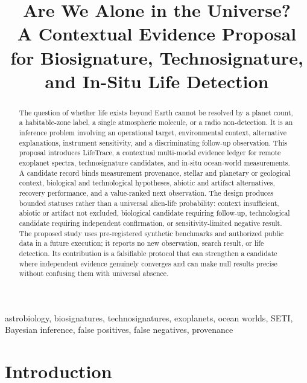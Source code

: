 \documentclass[conference]{IEEEtran}
\begin{document}
\title{Are We Alone in the Universe?\\
A Contextual Evidence Proposal for Biosignature, Technosignature, and In-Situ Life Detection}
\author{
}
\maketitle

\begin{abstract}
The question of whether life exists beyond Earth cannot be resolved by a planet count, a habitable-zone label, a single atmospheric molecule, or a radio non-detection. It is an inference problem involving an operational target, environmental context, alternative explanations, instrument sensitivity, and a discriminating follow-up observation. This proposal introduces LifeTrace, a contextual multi-modal evidence ledger for remote exoplanet spectra, technosignature candidates, and in-situ ocean-world measurements. A candidate record binds measurement provenance, stellar and planetary or geological context, biological and technological hypotheses, abiotic and artifact alternatives, recovery performance, and a value-ranked next observation. The design produces bounded statuses rather than a universal alien-life probability: context insufficient, abiotic or artifact not excluded, biological candidate requiring follow-up, technological candidate requiring independent confirmation, or sensitivity-limited negative result. The proposed study uses pre-registered synthetic benchmarks and authorized public data in a future execution; it reports no new observation, search result, or life detection. Its contribution is a falsifiable protocol that can strengthen a candidate where independent evidence genuinely converges and can make null results precise without confusing them with universal absence.
\end{abstract}
\begin{IEEEkeywords}
astrobiology, biosignatures, technosignatures, exoplanets, ocean worlds, SETI, Bayesian inference, false positives, false negatives, provenance
\end{IEEEkeywords}

\section{Introduction}
\end{document}
